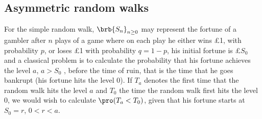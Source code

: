 \subsection{Asymmetric random walks}

\begin{example}\label{exa:randam_walk_simple}
For the simple random walk, $\brb{S_n}_{n\geq 0}$ may represent the fortune of a gambler after $n$ plays of a game where on each play he either wins \pounds 1, with probability $p$, or loses \pounds 1 with probability $q =
1-p$, his initial fortune is \pounds $S_0$ and a classical problem is to calculate the probability that his fortune achieves the level $a$, $a > S_0$ , before the time of ruin, that is the time that he goes bankrupt (his
fortune hits the level 0). If $T_a$ denotes the first time that the random walk hits the level $a$ and $T_0$ the time the random walk first hits the level 0, we would wish to calculate $\pro (T_a < T_0)$, given that his
fortune starts at $S_0 = r$, $0 < r < a$.
%
%
%
%
%
%
%
%
%
%
%
%
%
%
%



\end{example}
